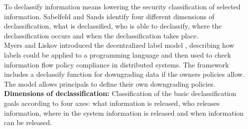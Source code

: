 To declassify information means lowering the security classification of selected information. Sabelfeld and Sands \cite{ref_3_sabelfeld2009declassification} identify four different dimensions of declassification, what is declassified, who is able to declassify, where the declassification occurs and when the declassification takes place.\\

Myers and Liskov introduced the decentralized label model \cite{ref_4_myers2000protecting}, describing how labels could be applied
to a programming language and then used to check information
flow policy compliance in distributed systems. The framework
includes a declassify function for downgrading data if the
owners policies allow. The model allows principals to define their own downgrading policies.\\

\textbf{Dimensions of declassification:}
Classification of the basic declassification goals according to four axes: what information is released, who releases information, where in the system information is released and when information can be released.

